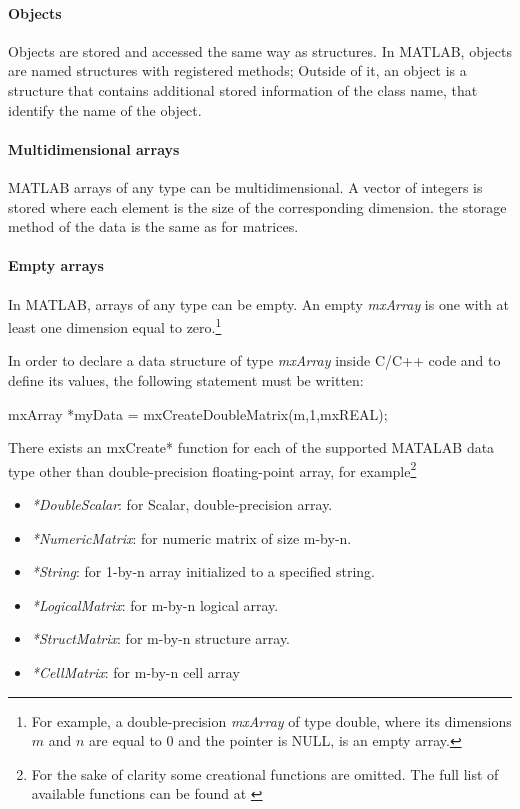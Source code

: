 \documentclass[12pt,a4paper]{extarticle}
\newcommand{\linespace}{\vspace{8pt}}
\begin{document}
\paragraph{Objects}
Objects are stored and accessed the same way as structures. In MATLAB, objects are named structures with registered methods; Outside of it, an object is a structure that contains additional stored information of the class name, that identify the name of the object.
\paragraph{Multidimensional arrays}
MATLAB arrays of any type can be multidimensional. A vector of integers is stored where each element is the size of the corresponding dimension. the storage method of the data is the same as for matrices.
\paragraph{Empty arrays}
In MATLAB, arrays of any type can be empty. An empty \textit{mxArray} is one with at least one dimension equal to zero.\footnote{For example, a double-precision \textit{mxArray} of type double, where its dimensions $m$ and $n$ are equal to 0 and the pointer is NULL, is an empty array.} 
\linespace

In order to declare a data structure of type \textit{mxArray} inside C/C++ code and to define its values, the following statement must be written:
\begin{cpp}[caption={Declaration and definition of a floating-point non complex mxArray named myData of size m-by-1, initialized to 0},label=code:createmydata] 
mxArray *myData = mxCreateDoubleMatrix(m,1,mxREAL);
\end{cpp}

There exists an mxCreate* function for each of the supported MATALAB data type other than double-precision floating-point array, for example\footnote{For the sake of clarity some creational functions are omitted. The full list of available functions can be found at \cite{create_del_mxarray:2}} 
\begin{itemize}
\item \textit{*DoubleScalar}: for Scalar, double-precision array.
\item \textit{*NumericMatrix}: for numeric matrix of size m-by-n.
\item \textit{*String}: for 1-by-n array initialized to a specified string.
\item \textit{*LogicalMatrix}: for m-by-n logical array.
\item \textit{*StructMatrix}: for m-by-n structure array.
\item \textit{*CellMatrix}: for m-by-n cell array
\end{itemize}
\end{document}
